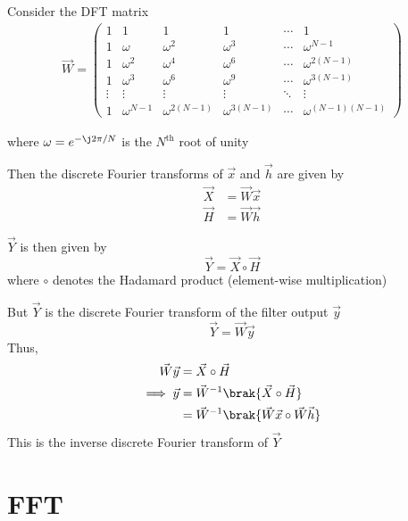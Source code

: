 \documentclass[journal,12pt,twocolumn]{IEEEtran}
\newcommand{\myvec}[1]{\ensuremath{\begin{pmatrix}#1\end{pmatrix}}}
\renewcommand\thesection{\arabic{section}}
\begin{document}
\begin{enumerate}[label=\thesection.\arabic*]
	Consider the DFT matrix
	\begin{align}
		\vec{W} = \myvec{
			1 & 1 & 1 & 1 & \cdots & 1 \\
			1 & \omega & \omega^2 & \omega^3 & \cdots & \omega^{N-1} \\
			1 & \omega^2 & \omega^4 & \omega^6 & \cdots & \omega^{2(N-1)} \\
			1 & \omega^3 & \omega^6 & \omega^9 & \cdots & \omega^{3(N-1)} \\
			\vdots & \vdots & \vdots & \vdots & \ddots & \vdots \\ 
			1 & \omega^{N-1} & \omega^{2(N-1)} & \omega^{3(N-1)} & \cdots & \omega^{(N-1)(N-1)}
		}
	\end{align}
	
	where $\omega = e^{-\j 2\pi/N}$ is the $N^{\mathrm{th}}$ root of unity
	
	Then the discrete Fourier transforms of $\vec{x}$ and $\vec{h}$ are given by
	\begin{align}
		\vec{X} &= \vec{W} \vec{x} \\
		\vec{H} &= \vec{W} \vec{h}
	\end{align}
	
	$\vec{Y}$ is then given by
	\begin{equation}
		\vec{Y} = \vec{X} \circ \vec{H}
	\end{equation}
	where $\circ$ denotes the Hadamard product (element-wise multiplication)
	
	But $\vec{Y}$ is the discrete Fourier transform of the filter output $\vec{y}$
	\begin{equation}
		\vec{Y} = \vec{W} \vec{y}
	\end{equation}
	Thus,
	\begin{align}
		\vec{W} \vec{y} &= \vec{X} \circ \vec{H} \\
		\implies \vec{y} &= \vec{W}^{-1} \brak{\vec{X} \circ \vec{H}} \\
		&= \vec{W}^{-1} \brak{\vec{W} \vec{x} \circ \vec{W} \vec{h}}
	\end{align}
	This is the inverse discrete Fourier transform of $\vec{Y}$
\end{enumerate}
\section{FFT}
\end{document}
